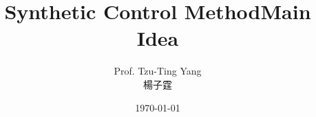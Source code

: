 \documentclass[hyperref={pdfpagelabels=false}]{beamer}
\title[]  
{Synthetic Control Method}
\author 
{Prof. Tzu-Ting Yang  \\ 楊子霆}
\institute{Institute of Economics, Academia Sinica  \\ 中央研究院經濟研究所}
\date
{\today}
\begin{document}
	
	
	\begin{frame}{}
	\titlepage
\end{frame}




\title[]  
{Main Idea}


\author 
{}

\institute{}






\date
{}


\begin{frame}{}
	\titlepage
\end{frame}





%			
%			
%		
%		
\end{document}
